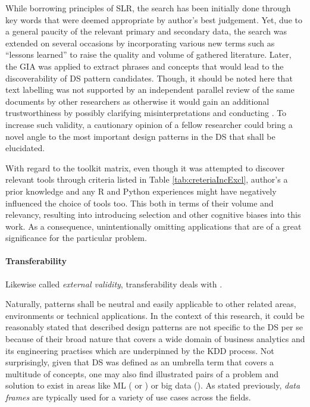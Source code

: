 While borrowing principles of \ac{SLR}, the search has been initially done through key words that were deemed appropriate by author's best judgement. 
Yet, due to a general paucity of the relevant primary and secondary data, the search was extended on several occasions by incorporating various new terms such as \enquote{lessons learned} to raise the quality and volume of gathered literature.
Later, the \ac{GIA} was applied to extract phrases and concepts that would lead to the discoverability of \ac{DS} pattern candidates.
Though, it should be noted here that text labelling was not supported by an independent parallel review of the same documents by other researchers as otherwise it would gain an additional trustworthiness by possibly clarifying misinterpretations and conducting  \parencite[243]{t06}.
To increase such validity, a cautionary opinion of a fellow researcher could bring a novel angle to the most important design patterns in the \ac{DS} that shall be elucidated.

With regard to the toolkit matrix, even though it was attempted to discover relevant tools through criteria listed in Table \ref{tab:creteriaIncExcl}, author's a prior knowledge and any R and Python experiences might have negatively influenced the choice of tools too. 
This both in terms of their volume and relevancy, resulting into introducing selection and other cognitive biases into this work. 
As a consequence, unintentionally omitting applications that are of a great significance for the particular problem.

\paragraph*{Transferability}
Likewise called \emph{external validity}, transferability deals with  \parencite[13]{GoFDesignPatternsAmpatzoglou2013}.

Naturally, patterns shall be neutral and easily applicable to other related areas, environments or technical applications.  
In the context of this research, it could be reasonably stated that described design patterns are not specific to the \ac{DS} per se because of their broad nature that covers a wide domain of business analytics and its engineering practises which are underpinned by the \ac{KDD} process.
Not surprisingly, given that \ac{DS} was defined as an umbrella term that covers a multitude of concepts, one may also find illustrated pairs of a problem and solution to exist in areas like \ac{ML} ( or ) or big data (). 
As stated previously, \emph{data frames} are typically used for a variety of use cases across the fields. 

